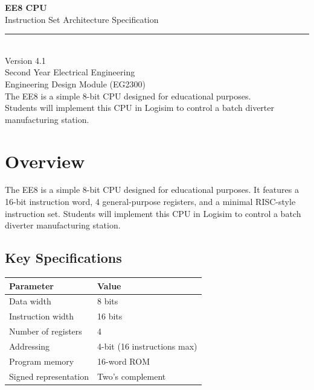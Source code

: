 \documentclass[11pt,a4paper]{article}
\begin{document}
\begin{titlepage}
\centering
\vspace*{3cm}

{\Huge\bfseries\color{ee8blue} EE8 CPU}\\[0.8cm]
{\LARGE Instruction Set Architecture Specification}\\[1.5cm]

\rule{0.6\textwidth}{1pt}\\[1.5cm]

{\Large Version 4.1}\\[0.6cm]
{\large Second Year Electrical Engineering}\\[0.3cm]
{\large Engineering Design Module (EG2300)}\\[3cm]

\vfill
{\small\textcolor{ee8gray}{The EE8 is a simple 8-bit CPU designed for educational purposes.\\
Students will implement this CPU in Logisim to control a batch diverter manufacturing station.}}
\end{titlepage}

\tableofcontents
\newpage

\section{Overview}

The EE8 is a simple 8-bit CPU designed for educational purposes. It features a 16-bit instruction word, 4 general-purpose registers, and a minimal RISC-style instruction set. Students will implement this CPU in Logisim to control a batch diverter manufacturing station.

\subsection{Key Specifications}

\begin{table}[H]
\centering
\begin{tabular}{@{}ll@{}}
\toprule
\textbf{Parameter} & \textbf{Value} \\
\midrule
Data width           & 8 bits \\
Instruction width    & 16 bits \\
Number of registers  & 4 \\
Addressing           & 4-bit (16 instructions max) \\
Program memory       & 16-word ROM \\
Signed representation & Two's complement \\
\bottomrule
\end{tabular}
\end{table}
\end{document}
